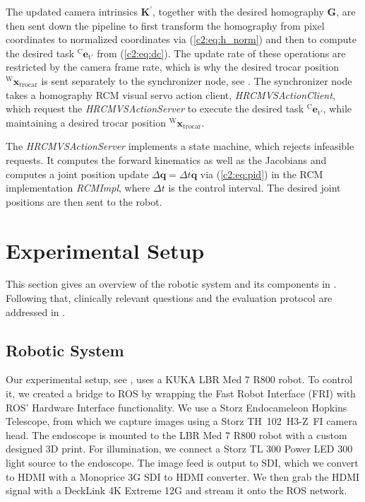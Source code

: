 The updated camera intrinsics $\mathbf{K}^\prime$, together with the desired homography $\mathbf{G}$, are then sent down the pipeline to first transform the homography from pixel coordinates to normalized coordinates via (\eqref{c2:eq:h_norm}) and then to compute the desired task $^\text{C}\mathbf{e}_{\text{t}'}$ from (\eqref{c2:eq:dc}). The update rate of these operations are restricted by the camera frame rate, which is why the desired trocar position $^\text{W}\mathbf{x}_\text{trocar}$ is sent separately to the synchronizer node, see . The synchronizer node takes a homography RCM visual servo action client, \textit{HRCMVSActionClient}, which request the \textit{HRCMVSActionServer} to execute the desired task $^\text{C}\mathbf{e}_{\text{t}'}$, while maintaining a desired trocar position $^\text{W}\mathbf{x}_\text{trocar}$. 

The \textit{HRCMVSActionServer} implements a state machine, which rejects infeasible requests. It computes the forward kinematics as well as the Jacobians and computes a joint position update $\Delta\mathbf{q}=\Delta t\dot{\mathbf{q}}$ via (\eqref{c2:eq:pid}) in the RCM implementation \textit{RCMImpl}, where $\Delta t$ is the control interval. The desired joint positions are then sent to the robot.

\section{Experimental Setup}
\label{c2:sec:experimental_setup}

This section gives an overview of the robotic system and its components in . Following that, clinically relevant questions and the evaluation protocol are addressed in .

\subsection{Robotic System}
\label{c2:sec:robotic_system}

Our experimental setup, see , uses a KUKA LBR Med 7 R800 robot. To control it, we created a bridge to ROS by wrapping the Fast Robot Interface (FRI) \cite{schreiber2010fast} with ROS' Hardware Interface functionality. We use a Storz Endocameleon Hopkins Telescope, from which we capture images using a Storz TH~102~H3-Z~FI camera head. The endoscope is mounted to the LBR Med 7 R800 robot with a custom designed 3D print. For illumination, we connect a Storz TL 300 Power LED 300 light source to the endoscope. The image feed is output to SDI, which we convert to HDMI with a Monoprice 3G SDI to HDMI converter. We then grab the HDMI signal with a DeckLink 4K Extreme 12G and stream it onto the ROS network.

